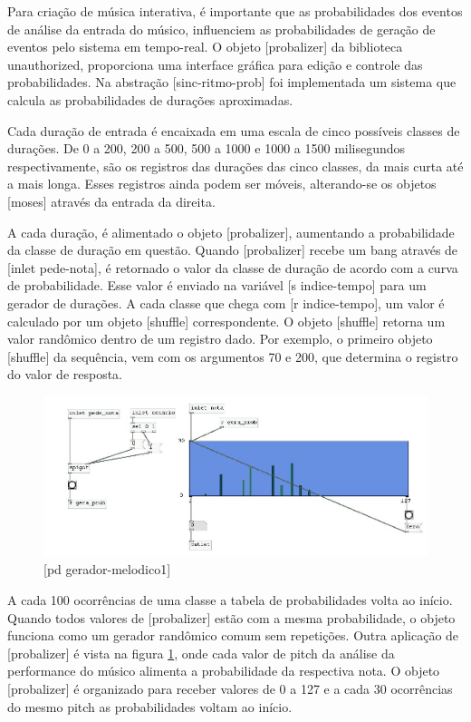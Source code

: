 \documentclass{ppgmus}
\begin{document}
Para criação de música interativa, é importante que as probabilidades
dos eventos de análise da entrada do músico, influenciem as probabilidades
de geração de eventos pelo sistema em tempo-real.
O objeto [probalizer] da biblioteca unauthorized, proporciona
uma interface gráfica para edição e controle das probabilidades.
Na abstração [sinc-ritmo-prob] foi implementada um sistema
que calcula as probabilidades de durações aproximadas.

Cada duração de entrada é encaixada em uma escala de cinco possíveis
classes de durações. De 0 a 200, 200 a 500, 500 a 1000 e 1000 a 1500 milisegundos
respectivamente, são os registros das durações das cinco classes,
da mais curta até a mais longa. 
Esses registros ainda podem ser móveis, alterando-se os objetos [moses]
através da entrada da direita.


A cada duração, é alimentado o objeto [probalizer], aumentando
a probabilidade da classe de duração em questão.
Quando [probalizer] recebe um bang através de [inlet pede-nota],
é retornado o valor da classe de duração de acordo com a curva
de probabilidade. Esse valor é enviado na variável [s indice-tempo]
para um gerador de durações. A cada classe que chega com [r indice-tempo],
um valor é calculado por um objeto [shuffle] correspondente. O objeto
[shuffle] retorna um valor randômico dentro de um registro dado. Por exemplo,
o primeiro objeto [shuffle] da sequência, vem com os argumentos 70 e 200, que determina
o registro do valor de resposta. 

\begin{figure}
\includegraphics[scale=.6]{gera-melodico1}
\caption{[pd gerador-melodico1]}
\label{gera-melodico1}
\end{figure}  

A cada 100 ocorrências de uma classe a tabela
de probabilidades volta ao início. Quando todos valores de [probalizer] estão
com a mesma probabilidade, o objeto funciona como um gerador randômico comum sem
repetições.
Outra aplicação de [probalizer] é vista na figura \ref{gera-melodico1},
onde cada valor de pitch da análise da performance do músico alimenta
a probabilidade da respectiva nota. O objeto [probalizer] é organizado
para receber valores de 0 a 127 e a cada 30 ocorrências do mesmo
pitch as probabilidades voltam ao início.
\end{document}
